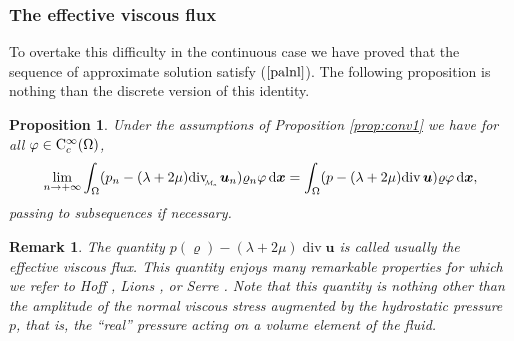 \documentclass{amsart}
\newtheorem{rmq}{Remark}
\newtheorem{prop}{Proposition}
\numberwithin{equation}{section}
\begin{document}
\subsubsection{The effective viscous flux}

To overtake this difficulty in the continuous case we have proved that the sequence of approximate solution satisfy ($\ref{palnl}$). The following proposition is nothing than the discrete version of this identity. 

\begin{prop}
Under the assumptions of Proposition \ref{prop:conv1}
we have  for all $\varphi \in {{\rm C}}^\infty_c(\Omega)$,
\begin{equation}\label{fevd}
\lim_{{n {\rightarrow} + \infty}} \int_\Omega (p_n -(\lambda+2\mu) {{\rm div}_{\hspace{-0.2em}\raisebox{-0.1em}{\scalebox{0.5}{${{\mathcal M}}_n$}}}}\,  {{\boldsymbol u}}_n) {\varrho}_n \varphi {\, {\rm d}{{\boldsymbol x}}} = \int_\Omega (p-(\lambda+2\mu) {{\rm div}}\,  {{\boldsymbol u}}) {\varrho} \varphi {\, {\rm d}{{\boldsymbol x}}},
\end{equation}
passing to subsequences if necessary.
\label{peff} \end{prop}

\begin{rmq}
The quantity $p({\varrho}) -(\lambda+2\mu)\operatorname{div} {\bm{u}} $ is called usually the effective viscous flux. This quantity enjoys many remarkable properties for which we refer to Hoff \cite{hoff1995strong}, Lions \cite{lions1998mathematical}, or Serre \cite{serre1991variations}. Note that this quantity is nothing other than the amplitude of the normal viscous stress augmented by the hydrostatic pressure $p$, that is, the ``real'' pressure acting on a volume element of the fluid.
\end{rmq}
\end{document}
